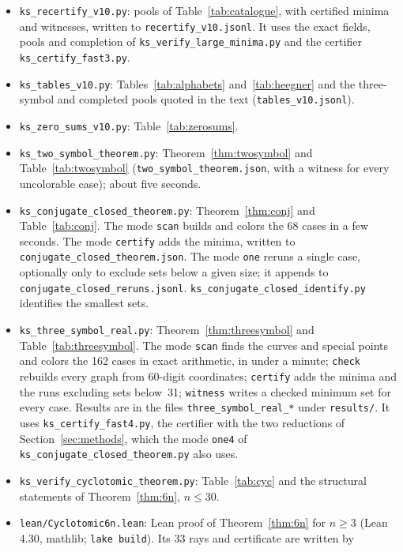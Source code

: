 \begin{itemize}\setlength{\itemsep}{0pt}
\item \texttt{ks\_recertify\_v10.py}: pools of Table~\ref{tab:catalogue}, with certified minima
and witnesses, written to \texttt{recertify\_v10.jsonl}.  It uses the exact fields, pools and
completion of \texttt{ks\_verify\_large\_minima.py} and the certifier
\texttt{ks\_certify\_fast3.py}.
\item \texttt{ks\_tables\_v10.py}: Tables~\ref{tab:alphabets} and~\ref{tab:heegner} and the
three-symbol and completed pools quoted in the text (\texttt{tables\_v10.jsonl}).
\item \texttt{ks\_zero\_sums\_v10.py}: Table~\ref{tab:zerosums}.
\item \texttt{ks\_two\_symbol\_theorem.py}: Theorem~\ref{thm:twosymbol} and
Table~\ref{tab:twosymbol} (\texttt{two\_symbol\_theorem.json}, with a witness for every
uncolorable case); about five seconds.
\item \texttt{ks\_conjugate\_closed\_theorem.py}: Theorem~\ref{thm:conj} and
Table~\ref{tab:conj}.  The mode \texttt{scan} builds and colors the 68 cases in a few seconds.
The mode \texttt{certify} adds the minima, written to
\texttt{conjugate\_closed\_theorem.json}.  The mode \texttt{one} reruns a single case,
optionally only to exclude sets below a given size; it appends to
\texttt{conjugate\_closed\_reruns.jsonl}.  \texttt{ks\_conjugate\_closed\_identify.py}
identifies the smallest sets.
\item \texttt{ks\_three\_symbol\_real.py}: Theorem~\ref{thm:threesymbol} and
Table~\ref{tab:threesymbol}.  The mode \texttt{scan} finds the curves and special points and
colors the 162 cases in exact arithmetic, in under a minute; \texttt{check} rebuilds every
graph from 60-digit coordinates; \texttt{certify} adds the minima and the runs excluding sets
below~31; \texttt{witness} writes a checked minimum set for every case.  Results are in the
files \texttt{three\_symbol\_real\_*} under \texttt{results/}.  It uses \texttt{ks\_certify\_fast4.py}, the
certifier with the two reductions of Section~\ref{sec:methods}, which the mode \texttt{one4} of
\texttt{ks\_conjugate\_closed\_theorem.py} also uses.
\item \texttt{ks\_verify\_cyclotomic\_theorem.py}: Table~\ref{tab:cyc} and the structural
statements of Theorem~\ref{thm:6n}, $n\le30$.
\item \texttt{lean/Cyclotomic6n.lean}: Lean proof of Theorem~\ref{thm:6n} for $n\ge3$ (Lean
4.30, mathlib; \texttt{lake build}).  Its 33 rays and certificate are written by

\end{itemize}
